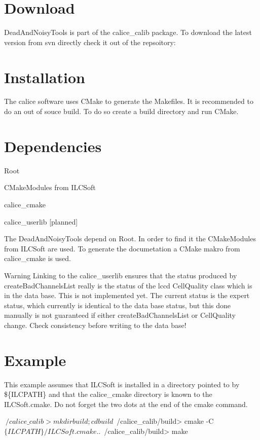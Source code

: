 \hypertarget{download_install_Download}{}\section{Download}\label{download_install_Download}
Dead\-And\-Noisy\-Tools is part of the calice\-\_\-calib package. To download the latest version from svn directly check it out of the repsoitory\-: 
\hypertarget{download_install_Installation}{}\section{Installation}\label{download_install_Installation}
The calice software uses C\-Make to generate the Makefiles. It is recommended to do an out of souce build. To do so create a build directory and run C\-Make.\hypertarget{download_install_Dependencies}{}\section{Dependencies}\label{download_install_Dependencies}
\begin{DoxyItemize}
\item Root \item C\-Make\-Modules from I\-L\-C\-Soft \item calice\-\_\-cmake \item calice\-\_\-userlib \mbox{[}planned\mbox{]}\end{DoxyItemize}
The Dead\-And\-Noisy\-Tools depend on Root. In order to find it the C\-Make\-Modules from I\-L\-C\-Soft are used. To generate the documetation a C\-Make makro from calice\-\_\-cmake is used.

\begin{DoxyWarning}{Warning}
Linking to the calice\-\_\-userlib ensures that the status produced by create\-Bad\-Channels\-List really is the status of the lccd {\ttfamily Cell\-Quality} class which is in the data base. This is not implemented yet. The current status is the expert status, which currently is identical to the data base status, but this done manually is not guaranteed if either create\-Bad\-Channels\-List or {\ttfamily Cell\-Quality} change. Check consistency before writing to the data base!
\end{DoxyWarning}
\hypertarget{download_install_installExample}{}\section{Example}\label{download_install_installExample}
This example assumes that I\-L\-C\-Soft is installed in a directory pointed to by \$\{I\-L\-C\-P\-A\-T\-H\} and that the calice\-\_\-cmake directory is known to the I\-L\-C\-Soft.\-cmake. Do not forget the two dots at the end of the cmake command. 
\begin{DoxyCode}
$~/calice\_calib> mkdir build; cd build
$~/calice\_calib/build> cmake -C $\{ILCPATH\}/ILCSoft.cmake ..
$~/calice\_calib/build> make
\end{DoxyCode}
 